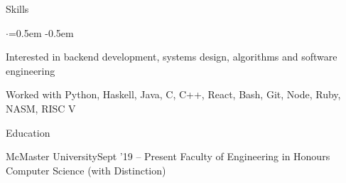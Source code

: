\documentclass{resume} %
\begin{document}

\begin{rSection}{Skills}
  \vspace {0.2em}
  \begin{list}{$\cdot$}{\leftmargin=0.5em}
    \itemsep -0.5em \vspace{-0.3em}
    \item Interested in backend development, systems design, algorithms and
      software engineering
    \item Worked with Python, Haskell, Java, C, C++, React, Bash,
      Git, Node, Ruby, NASM, RISC V
  \end{list}
  \vspace{0.1em}
\end{rSection}


\begin{rSection}{Education}
  \begin{rEducationSection}{McMaster University}{Sept '19 -- Present}
                     {Faculty of Engineering in Honours Computer Science (with Distinction)}{}
  \end{rEducationSection}
\end{rSection}

\end{document}
